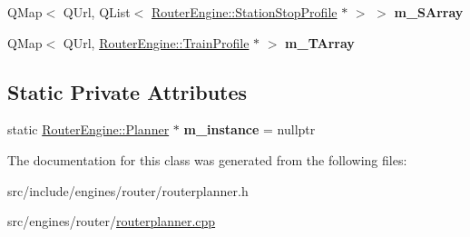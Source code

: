 \begin{DoxyCompactItemize}
\item 
\mbox{\label{classRouterEngine_1_1Planner_a0e87ce62e7806454f72dfe3dc5a79c00}} 
Q\+Map$<$ Q\+Url, Q\+List$<$ \mbox{\hyperlink{classRouterEngine_1_1StationStopProfile}{Router\+Engine\+::\+Station\+Stop\+Profile}} $\ast$ $>$ $>$ {\bfseries m\+\_\+\+S\+Array}
\item 
\mbox{\label{classRouterEngine_1_1Planner_a14f0e0c95b7404fec05648ad34f5285e}} 
Q\+Map$<$ Q\+Url, \mbox{\hyperlink{classRouterEngine_1_1TrainProfile}{Router\+Engine\+::\+Train\+Profile}} $\ast$ $>$ {\bfseries m\+\_\+\+T\+Array}
\end{DoxyCompactItemize}
\subsection*{Static Private Attributes}
\begin{DoxyCompactItemize}
\item 
\mbox{\label{classRouterEngine_1_1Planner_a49a7ba0c183633e522d4d7ba674ecc18}} 
static \mbox{\hyperlink{classRouterEngine_1_1Planner}{Router\+Engine\+::\+Planner}} $\ast$ {\bfseries m\+\_\+instance} = nullptr
\end{DoxyCompactItemize}


The documentation for this class was generated from the following files\+:\begin{DoxyCompactItemize}
\item 
src/include/engines/router/routerplanner.\+h\item 
src/engines/router/\mbox{\hyperlink{routerplanner_8cpp}{routerplanner.\+cpp}}\end{DoxyCompactItemize}

